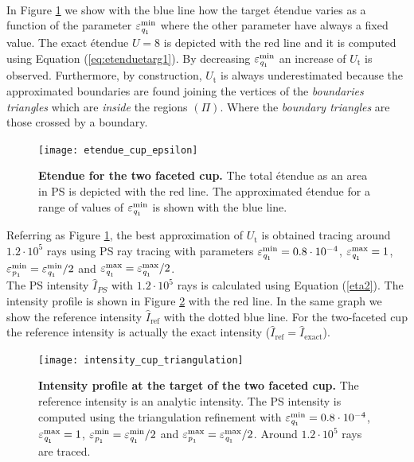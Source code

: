 \\ \indent In Figure \ref{fig:etendue_cup} we show with the blue line how the target \'{e}tendue varies as a function of the parameter $\varepsilon_{\textit{q}_1}^{\textrm{min}}$ where the other parameter have always a fixed value. The exact \'{e}tendue $U=8$ is depicted with the red line and it is computed using Equation (\ref{eq:etenduetarg1}). By decreasing $\varepsilon_{\textit{q}_1}^{\textrm{min}}$ an increase of $U_{\textrm{t}}$ is observed. Furthermore, by construction, $U_{\textrm{t}}$ is always underestimated because the approximated boundaries are found joining the vertices of the \textit{boundaries triangles} which are \textit{inside} the regions $(\Pi)$. Where the \textit{boundary triangles} are those crossed by a boundary.
 \begin{figure}[h!]
  \center
  \texttt{[image: etendue\_cup\_epsilon]}
  \caption{\textbf{Etendue for the two faceted cup.} The total \'{e}tendue as an area in PS is depicted with the red line. The approximated \'{e}tendue for a range of values of 
$\varepsilon_{\textit{q}_1}^{\textrm{min}}$ is shown with the blue line.}
  \label{fig:etendue_cup}
\end{figure}
Referring as Figure \ref{fig:etendue_cup}, the best approximation of $U_{\textrm{t}}$ is obtained tracing around $1.2 \cdot 10^5$ rays using PS ray tracing with parameters $\varepsilon_{\textit{q}_1}^{\textrm{min}}=0.8\cdot 10^{-4}$, $\varepsilon_{\textit{q}_1}^{\textrm{max}}=1$, $\varepsilon_{\textit{p}_1}^{\textrm{min}}=\varepsilon_{\textit{q}_1}^{\textrm{min}}/2$ and $\varepsilon_{\textit{q}_1}^{\textrm{max}}= \varepsilon_{\textit{q}_1}^{\textrm{max}}/2$. 
\\ \indent The PS intensity $\hat{I}_{PS}$ with $1.2 \cdot 10^5$ rays is calculated using Equation (\ref{eta2}). The intensity profile is shown in Figure \ref{fig:intensity_cup_triangulation} with the red line. In the same graph we show the reference intensity $\hat{I}_{\textrm{ref}}$ with the dotted blue line. For the two-faceted cup the reference intensity is actually the exact intensity ($\hat{I}_{\textrm{ref}}= \hat{I}_{\textrm{exact}}$). 
 \begin{figure}[h!]
  \center
  \texttt{[image: intensity\_cup\_triangulation]}
  \caption{\textbf{Intensity profile at the target of the two faceted cup.} The reference intensity is an analytic intensity. The PS intensity is computed using the triangulation refinement with $\varepsilon_{\textit{q}_1}^{\textrm{min}}=0.8\cdot 10^{-4}$, $\varepsilon_{\textit{q}_1}^{\textrm{max}}=1$, $\varepsilon_{\textit{p}_1}^{\textrm{min}}=\varepsilon_{\textit{q}_1}^{\textrm{min}}/2$ and $\varepsilon_{\textit{p}_1}^{\textrm{max}}= \varepsilon_{\textit{q}_1}^{\textrm{max}}/2$. Around $1.2 \cdot 10^5$ rays are traced.}
  \label{fig:intensity_cup_triangulation}
\end{figure}
